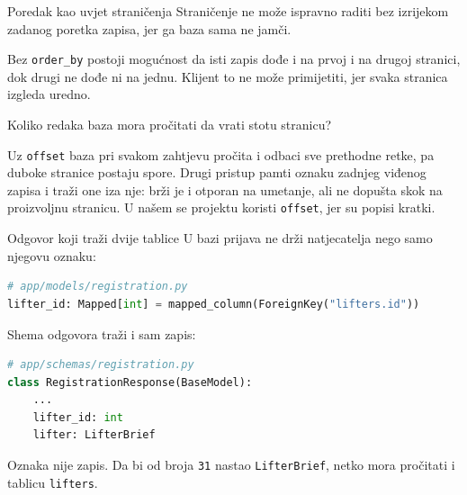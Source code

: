 \begin{frame}{Poredak kao uvjet straničenja}
Straničenje ne može ispravno raditi bez izrijekom zadanog poretka zapisa, jer ga baza sama ne jamči.

\vspace{1.1em}
Bez \texttt{order\_by} postoji mogućnost da isti zapis dođe i na prvoj i na drugoj stranici, dok drugi ne dođe ni na jednu. Klijent to ne može primijetiti, jer svaka stranica izgleda uredno.

\vspace{1.1em}
Koliko redaka baza mora pročitati da vrati stotu stranicu?

\pause
\begin{konvencija}
Uz \texttt{offset} baza pri svakom zahtjevu pročita i odbaci sve prethodne retke, pa duboke stranice postaju spore. Drugi pristup pamti oznaku zadnjeg viđenog zapisa i traži one iza nje: brži je i otporan na umetanje, ali ne dopušta skok na proizvoljnu stranicu. U našem se projektu koristi \texttt{offset}, jer su popisi kratki.
\end{konvencija}
\end{frame}

\begin{frame}[fragile]{Odgovor koji traži dvije tablice}
U bazi prijava ne drži natjecatelja nego samo njegovu oznaku:

\begin{lstlisting}[language=python]
# app/models/registration.py
lifter_id: Mapped[int] = mapped_column(ForeignKey("lifters.id"))
\end{lstlisting}

\vspace{0.5em}
Shema odgovora traži i sam zapis:

\begin{lstlisting}[language=python]
# app/schemas/registration.py
class RegistrationResponse(BaseModel):
    ...
    lifter_id: int
    lifter: LifterBrief
\end{lstlisting}

\vspace{0.5em}
Oznaka nije zapis. Da bi od broja \texttt{31} nastao \texttt{LifterBrief}, netko mora pročitati i tablicu \texttt{lifters}.
\end{frame}

